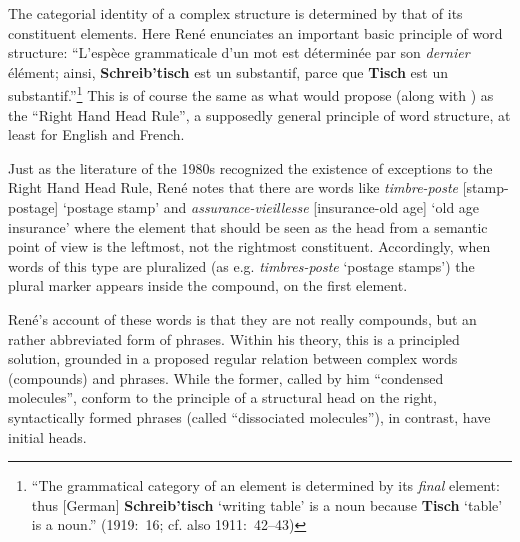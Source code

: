 \documentclass[output=paper]{langsci/langscibook}
\begin{document}
The categorial identity of a complex structure is determined by that
of its constituent elements. Here René enunciates an important basic
principle of word structure: ``L'espèce grammaticale d'un mot est
déterminée par son \emph{dernier} élément; ainsi,
\textbf{Schreib'tisch} est un substantif, parce que \textbf{Tisch} est
un substantif.''\footnote{``The grammatical category of an element is
  determined by its \emph{final} element: thus {[German]}
  \textbf{Schreib'tisch} `writing table' is a noun because
  \textbf{Tisch} `table' is a noun.'' (1919:~16; cf. also
  1911:~42--43)}  This is of course the same as what
\citet{williams:heads} would propose (along with
\citealt{selkirk:wordsyntax}) as the ``Right Hand Head Rule'', a
supposedly general principle of word structure, at least for English
and French.

Just as the literature of the 1980s recognized the existence of
exceptions to the Right Hand Head Rule, René notes that there are
words like \emph{timbre-poste} {[stamp-postage]} `postage stamp' and
\emph{assurance-vieillesse} {[insurance-old age]} `old age insurance'
where the element that should be seen as the head from a semantic
point of view is the leftmost, not the rightmost constituent.
Accordingly, when words of this type are pluralized (as
e.g. \emph{timbres-poste} `postage stamps') the plural marker appears
inside the compound, on the first element.

René's account of these words is that they are not really compounds,
but an rather abbreviated form of phrases.  Within his theory, this is
a principled solution, grounded in a proposed regular relation between
complex words (compounds) and phrases. While the former, called by him
``condensed molecules'', conform to the principle of a structural head
on the right, syntactically formed phrases (called ``dissociated
molecules''), in contrast, have initial heads.  
\end{document}
